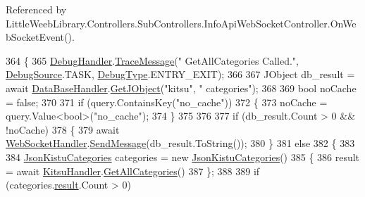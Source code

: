 Referenced by Little\+Weeb\+Library.\+Controllers.\+Sub\+Controllers.\+Info\+Api\+Web\+Socket\+Controller.\+On\+Web\+Socket\+Event().


\begin{DoxyCode}
364         \{
365             \mbox{\hyperlink{class_little_weeb_library_1_1_handlers_1_1_debug_handler}{DebugHandler}}.\mbox{\hyperlink{class_little_weeb_library_1_1_handlers_1_1_debug_handler_afccb37dfd6b2114af72000c2f4fe4607}{TraceMessage}}(\textcolor{stringliteral}{" GetAllCategories Called."}, 
      \mbox{\hyperlink{namespace_little_weeb_library_1_1_handlers_a2a6ca0775121c9c503d58aa254d292be}{DebugSource}}.TASK, \mbox{\hyperlink{namespace_little_weeb_library_1_1_handlers_ab66019ed40462876ec4e61bb3ccb0a62}{DebugType}}.ENTRY\_EXIT);
366 
367             JObject db\_result = await \mbox{\hyperlink{class_little_weeb_library_1_1_handlers_1_1_data_base_handler}{DataBaseHandler}}.\mbox{\hyperlink{class_little_weeb_library_1_1_handlers_1_1_data_base_handler_a7f61583807f99b7838a33d2db0f7ca68}{GetJObject}}(\textcolor{stringliteral}{"kitsu"}, \textcolor{stringliteral}{"
      categories"});
368 
369             \textcolor{keywordtype}{bool} noCache = \textcolor{keyword}{false};
370 
371             \textcolor{keywordflow}{if} (query.ContainsKey(\textcolor{stringliteral}{"no\_cache"}))
372             \{
373                 noCache = query.Value<\textcolor{keywordtype}{bool}>(\textcolor{stringliteral}{"no\_cache"});
374             \}
375 
376 
377             \textcolor{keywordflow}{if} (db\_result.Count > 0 && !noCache)
378             \{
379                 await \mbox{\hyperlink{class_little_weeb_library_1_1_handlers_1_1_web_socket_handler}{WebSocketHandler}}.\mbox{\hyperlink{class_little_weeb_library_1_1_handlers_1_1_web_socket_handler_a1de289d54d665a32c93478c68d3e6ad0}{SendMessage}}(db\_result.ToString());
380             \}
381             \textcolor{keywordflow}{else}
382             \{
383 
384                 \mbox{\hyperlink{class_little_weeb_library_1_1_models_1_1_json_kistu_categories}{JsonKistuCategories}} categories = \textcolor{keyword}{new} 
      \mbox{\hyperlink{class_little_weeb_library_1_1_models_1_1_json_kistu_categories}{JsonKistuCategories}}()
385                 \{
386                     result = await \mbox{\hyperlink{class_little_weeb_library_1_1_handlers_1_1_kitsu_handler}{KitsuHandler}}.\mbox{\hyperlink{class_little_weeb_library_1_1_handlers_1_1_kitsu_handler_ae329f7e735a6abee2734bbbd13d121b2}{GetAllCategories}}()
387                 \};
388 
389                 \textcolor{keywordflow}{if} (categories.\mbox{\hyperlink{class_little_weeb_library_1_1_models_1_1_json_kistu_categories_a9060b93b9300d3a6508ccd8c3bf34cd1}{result}}.Count > 0)

\end{DoxyCode}
